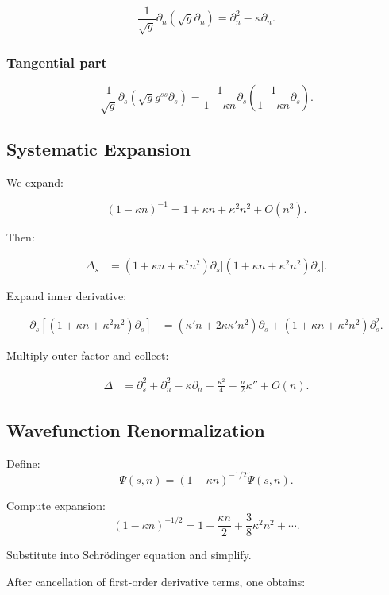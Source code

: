 \documentclass[11pt]{article}
\begin{document}
\[
\frac{1}{\sqrt{g}}\partial_n(\sqrt{g}\partial_n)
= \partial_n^2 - \kappa \partial_n.
\]

\subsubsection{Tangential part}

\[
\frac{1}{\sqrt{g}}\partial_s\left(\sqrt{g} g^{ss}\partial_s\right)
= \frac{1}{1-\kappa n}\partial_s\left(\frac{1}{1-\kappa n}\partial_s\right).
\]

\subsection{Systematic Expansion}

We expand:

\[
(1-\kappa n)^{-1}
= 1 + \kappa n + \kappa^2 n^2 + O(n^3).
\]

Then:

\begin{align}
\Delta_s
&= (1+\kappa n + \kappa^2 n^2)
\partial_s\Big[(1+\kappa n + \kappa^2 n^2)\partial_s\Big].
\end{align}

Expand inner derivative:

\begin{align}
\partial_s[(1+\kappa n + \kappa^2 n^2)\partial_s]
&= (\kappa' n + 2\kappa\kappa' n^2)\partial_s
+ (1+\kappa n + \kappa^2 n^2)\partial_s^2.
\end{align}

Multiply outer factor and collect:

\begin{align}
\Delta
&= \partial_s^2 + \partial_n^2
- \kappa \partial_n
- \frac{\kappa^2}{4}
- \frac{n}{2}\kappa'' 
+ O(n).
\end{align}

\subsection{Wavefunction Renormalization}

Define:
\[
\Psi(s,n) = (1-\kappa n)^{-1/2} \tilde{\Psi}(s,n).
\]

Compute expansion:
\[
(1-\kappa n)^{-1/2}
= 1 + \frac{\kappa n}{2} + \frac{3}{8}\kappa^2 n^2 + \cdots.
\]

Substitute into Schr\"odinger equation and simplify.

After cancellation of first-order derivative terms, one obtains:
\end{document}
